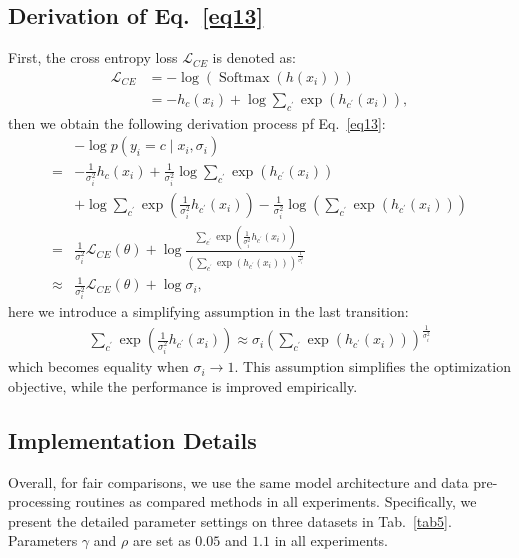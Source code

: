 \documentclass[10pt,twocolumn,letterpaper]{article}
\begin{document}
\subsection{Derivation of Eq.~\ref{eq13}}
First, the cross entropy loss $\mathcal{L}_{CE}$ is denoted as:
\begin{equation}
	\begin{split}
		\mathcal{L}_{C E} &=-\log \left(\operatorname{Softmax}\left(h\left(x_{i}\right)\right)\right) \\
		&=-h_{c}\left(x_{i}\right)+\log \sum_{c^{\prime}} \exp \left(h_{c^{\prime}}\left(x_{i}\right)\right),
\end{split}
\end{equation}
then we obtain the following derivation process pf Eq.~\ref{eq13}:
\begin{equation}
	\begin{split}
	&-\log p\left(y_{i}=c \mid x_{i}, \sigma_{i}\right) \\
	=&-\frac{1}{\sigma_{i}^{2}} h_{c}\left(x_{i}\right)+\frac{1}{\sigma_{i}^{2}} \log \sum_{c^{\prime}} \exp \left(h_{c^{\prime}}\left(x_{i}\right)\right) \\
	&+\log \sum_{c^{\prime}} \exp \left(\frac{1}{\sigma_{i}^{2}} h_{c^{\prime}}\left(x_{i}\right)\right)-\frac{1}{\sigma_{i}^{2}} \log \left(\sum_{c^{\prime}} \exp \left(h_{c^{\prime}}\left(x_{i}\right)\right)\right) \\
	=& \frac{1}{\sigma_{i}^{2}} \mathcal{L}_{C E}(\theta)+\log \frac{\sum_{c^{\prime}} \exp \left(\frac{1}{\sigma_{i}^{2}} h_{c^{\prime}}\left(x_{i}\right)\right)}{\left(\sum_{c^{\prime}} \exp \left(h_{c^{\prime}}\left(x_{i}\right)\right)\right)^{\frac{1}{\sigma_{i}^{2}}}} \\
	\approx & \frac{1}{\sigma_{i}^{2}} \mathcal{L}_{C E}(\theta)+\log \sigma_{i},
\end{split}
\end{equation}
here we introduce a simplifying assumption in the last transition:
{\small \begin{align}
\sum_{c^{\prime}} \exp \left(\frac{1}{\sigma_{i}^{2}} h_{c^{\prime}}\left(x_{i}\right)\right) \approx \sigma_{i}\left(\sum_{c^{\prime}} \exp \left(h_{c^{\prime}}\left(x_{i}\right)\right)\right)^{\frac{1}{\sigma_{i}^{2}}}
\end{align}}
which becomes equality when $\sigma_i\to 1$. This assumption simplifies the optimization objective, while the performance is improved empirically. 

\subsection{Implementation Details}
Overall, for fair comparisons, we use the same model architecture and data pre-processing routines as compared methods in all experiments. Specifically, we present the detailed parameter settings on three datasets in Tab.~\ref{tab5}. Parameters $\gamma$ and $\rho$ are set as $0.05$ and $1.1$ in all experiments.
\end{document}
